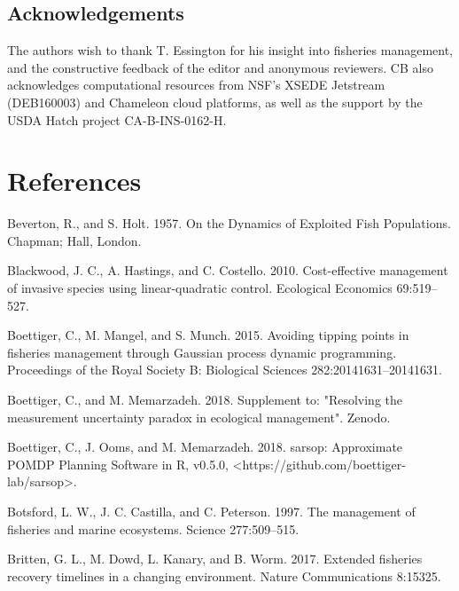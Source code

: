 \documentclass[3p]{elsarticle} %
\begin{document}
\hypertarget{acknowledgements}{%
\subsection{Acknowledgements}\label{acknowledgements}}

The authors wish to thank T. Essington for his insight into fisheries
management, and the constructive feedback of the editor and anonymous
reviewers. CB also acknowledges computational resources from NSF's XSEDE
Jetstream (DEB160003) and Chameleon cloud platforms, as well as the
support by the USDA Hatch project CA-B-INS-0162-H.

\hypertarget{references}{%
\section*{References}\label{references}}

\hypertarget{refs}{}
\leavevmode\hypertarget{ref-Beverton1957}{}%
Beverton, R., and S. Holt. 1957. On the Dynamics of Exploited Fish
Populations. Chapman; Hall, London.

\leavevmode\hypertarget{ref-Blackwood2010}{}%
Blackwood, J. C., A. Hastings, and C. Costello. 2010. Cost-effective
management of invasive species using linear-quadratic control.
Ecological Economics 69:519--527.

\leavevmode\hypertarget{ref-Boettiger2015}{}%
Boettiger, C., M. Mangel, and S. Munch. 2015. Avoiding tipping points in
fisheries management through Gaussian process dynamic programming.
Proceedings of the Royal Society B: Biological Sciences
282:20141631--20141631.

\leavevmode\hypertarget{ref-pomdp-intro}{}%
Boettiger, C., and M. Memarzadeh. 2018. Supplement to: "Resolving the
measurement uncertainty paradox in ecological management". Zenodo.

\leavevmode\hypertarget{ref-sarsop-pkg}{}%
Boettiger, C., J. Ooms, and M. Memarzadeh. 2018. sarsop: Approximate
POMDP Planning Software in R, v0.5.0,
\textless{}https://github.com/boettiger-lab/sarsop\textgreater{}.

\leavevmode\hypertarget{ref-Botsford1997}{}%
Botsford, L. W., J. C. Castilla, and C. Peterson. 1997. The management
of fisheries and marine ecosystems. Science 277:509--515.

\leavevmode\hypertarget{ref-Britten2017}{}%
Britten, G. L., M. Dowd, L. Kanary, and B. Worm. 2017. Extended
fisheries recovery timelines in a changing environment. Nature
Communications 8:15325.
\end{document}
